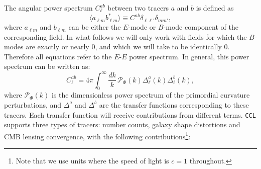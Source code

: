 \documentclass[\docopts]{\docclass}
\newcommand{\ccl}{{\tt CCL}\xspace}
\begin{document}
The angular power spectrum $C^{ab}_\ell$ between two tracers $a$ and $b$ is defined as
\begin{equation}
  \langle a_{\ell m}b^*_{\ell m}\rangle\equiv C^{ab}\delta_{\ell\ell'}\delta_{mm'},
  \label{eq:clgen}
\end{equation}
where $a_{\ell m}$ and $b_{\ell m}$ can be either the $E$-mode or $B$-mode component of the corresponding field. In what follows we will only work with fields for which the $B$-modes are exactly or nearly $0$, and which we will take to be identically $0$. Therefore all equations refer to the $E$-$E$ power spectrum. In general, this power spectrum can be written as:
\begin{equation}
  C^{ab}_\ell=4\pi\int_0^\infty \frac{dk}{k}\,\mathcal{P}_\Phi(k)\Delta^a_\ell(k)\Delta^b_\ell(k),
  \label{eq:cls}
\end{equation}
where $\mathcal{P}_\Phi(k)$ is the dimensionless power spectrum of the primordial curvature perturbations, and $\Delta^a$ and $\Delta^b$ are the transfer functions corresponding to these tracers. Each transfer function will receive contributions from different terms. \ccl supports three types of tracers: number counts, galaxy shape distortions and CMB lensing convergence, with the following contributions\footnote{Note that we use units where the speed of light is $c=1$ throughout.}:
\end{document}

